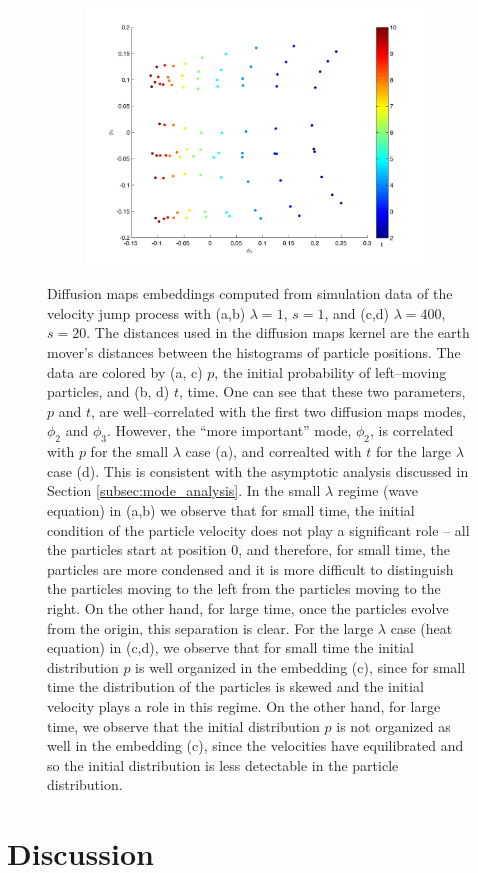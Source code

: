 \documentclass[prl,preprint]{revtex4-1}
\begin{document}
\begin{figure}[htb]
\begin{subfigure}{0.5\textwidth}
\caption{}
\end{subfigure}
\begin{subfigure}{0.5\textwidth}
\includegraphics[width=\textwidth]{EMD_t_400}
\caption{}
\end{subfigure}
\caption{Diffusion maps embeddings computed from simulation data of the velocity jump process with (a,b) $\lambda=1$, $s=1$, and (c,d) $\lambda=400$, $s=20$. The distances used in the diffusion maps kernel are the earth mover's distances between the histograms of particle positions. The data are colored by (a, c) $p$, the initial probability of left--moving particles, and (b, d) $t$, time. One can see that these two parameters, $p$ and $t$, are well--correlated with the first two diffusion maps modes, $\phi_2$ and $\phi_3$. However, the ``more important'' mode, $\phi_2$, is correlated with $p$ for the small $\lambda$ case (a), and correalted with $t$ for the large $\lambda$ case (d). This is consistent with the asymptotic analysis discussed in Section \ref{subsec:mode_analysis}. In the small $\lambda$ regime (wave equation) in (a,b) we observe that for small time, the initial condition of the particle velocity does not play a significant role -- all the particles start at position $0$, and therefore, for small time, the particles are more condensed and it is more difficult to distinguish the particles moving to the left from the particles moving to the right. On the other hand, for large time, once the particles evolve from the origin, this separation is clear.  For the large $\lambda$ case (heat equation) in (c,d), we observe that for small time the initial distribution $p$ is well organized in the embedding (c), since for small time the distribution of the particles is skewed and the initial velocity plays a role in this regime. On the other hand, for large time, we observe that the initial distribution $p$ is not organized as well in the embedding (c), since the velocities have equilibrated and so the initial distribution is less detectable in the particle distribution.}
\label{fig:dmaps_embed}
\end{figure}

\section{Discussion}



\end{document}
